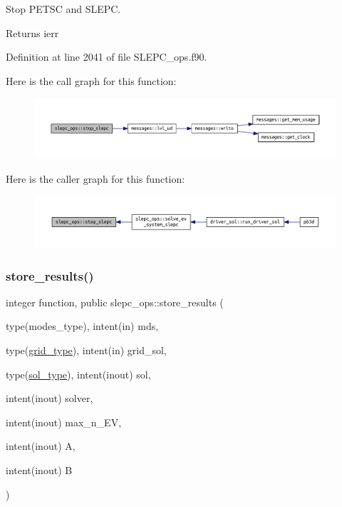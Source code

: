 Stop P\+E\+T\+SC and S\+L\+E\+PC. 

\begin{DoxyReturn}{Returns}
ierr 
\end{DoxyReturn}


Definition at line 2041 of file S\+L\+E\+P\+C\+\_\+ops.\+f90.

Here is the call graph for this function\+:\nopagebreak
\begin{figure}[H]
\begin{center}
\leavevmode
\includegraphics[width=350pt]{namespaceslepc__ops_aeeac6908b3988f395314e7769829a058_cgraph}
\end{center}
\end{figure}
Here is the caller graph for this function\+:\nopagebreak
\begin{figure}[H]
\begin{center}
\leavevmode
\includegraphics[width=350pt]{namespaceslepc__ops_aeeac6908b3988f395314e7769829a058_icgraph}
\end{center}
\end{figure}
\mbox{\label{namespaceslepc__ops_a24d97496000ed55f1d11e4d436e084a6}} 
\subsubsection{\texorpdfstring{store\+\_\+results()}{store\_results()}}
{\footnotesize\ttfamily integer function, public slepc\+\_\+ops\+::store\+\_\+results (\begin{DoxyParamCaption}\item[{type(modes\+\_\+type), intent(in)}]{mds,  }\item[{type(\hyperlink{structgrid__vars_1_1grid__type}{grid\+\_\+type}), intent(in)}]{grid\+\_\+sol,  }\item[{type(\hyperlink{structsol__vars_1_1sol__type}{sol\+\_\+type}), intent(inout)}]{sol,  }\item[{intent(inout)}]{solver,  }\item[{intent(inout)}]{max\+\_\+n\+\_\+\+EV,  }\item[{intent(inout)}]{A,  }\item[{intent(inout)}]{B }\end{DoxyParamCaption})}



